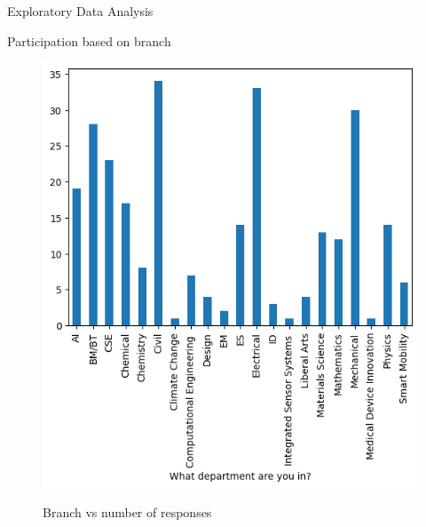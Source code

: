\documentclass{beamer}
\begin{document}
\begin{frame}{Exploratory Data Analysis}
\begin{block}{Participation based on branch}
\begin{figure}
      \centering
    \caption{Branch vs number of responses}
    \includegraphics[scale = 0.55]{bar_department.png}  
    \label{fig:side-by-side}
\end{figure}
\end{block}
\end{frame}
\end{document}
